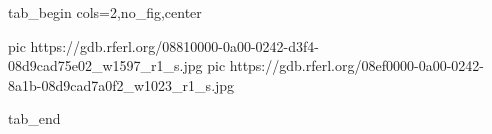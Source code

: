  
 
 
 
 

\ifcmt
  tab_begin cols=2,no_fig,center

     pic https://gdb.rferl.org/08810000-0a00-0242-d3f4-08d9cad75e02_w1597_r1_s.jpg
		 pic https://gdb.rferl.org/08ef0000-0a00-0242-8a1b-08d9cad7a0f2_w1023_r1_s.jpg

  tab_end
\fi
